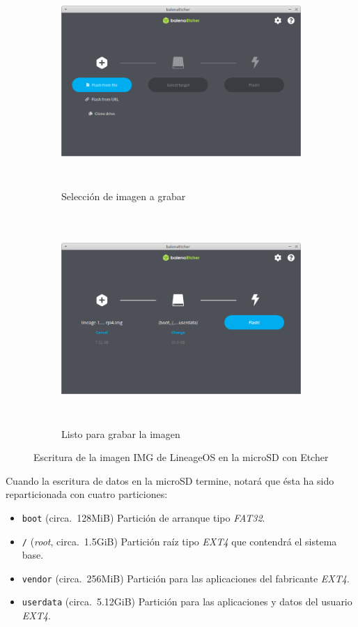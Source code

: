 \documentclass[letterpaper,10.5pt]{article}
\begin{document}
\begin{figure}[H]
	\centering%
	\begin{subfigure}[b]{0.5\linewidth}
		\centering
		\includegraphics[width=0.9\linewidth,height=8cm,keepaspectratio]{img/p02-02-etcher-a.png} %
		\caption{Selección de imagen a grabar}
		\label{fig:write-image-linux-a} %
	\end{subfigure}%
	\begin{subfigure}[b]{0.5\linewidth}
		\centering
		\includegraphics[width=0.9\linewidth,height=8cm,keepaspectratio]{img/p02-02-etcher-b.png} %
		\caption{Listo para grabar la imagen}
		\label{fig:write-image-linux-b} %
	\end{subfigure}
	\caption{Escritura de la imagen IMG de LineageOS en la microSD con Etcher}%
	\label{fig:write-image-linux} %
\end{figure}

Cuando la escritura de datos en la microSD termine, notará que ésta ha sido reparticionada con cuatro particiones:
\begin{itemize}[nosep]
	\item\texttt{boot} (circa.~128MiB) Partición de arranque tipo \textit{FAT32}.
	\item \texttt{/} (\emph{root}, circa.~1.5GiB) Partición raíz tipo \textit{EXT4} que contendrá el sistema base.
	\item \texttt{vendor} (circa.~256MiB) Partición para las aplicaciones del fabricante \textit{EXT4}.
	\item \texttt{userdata} (circa.~5.12GiB) Partición para las aplicaciones y datos del usuario \textit{EXT4}.
\end{itemize}
\end{document}
